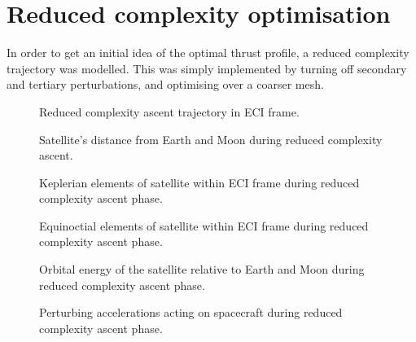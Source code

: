
\section{Reduced complexity optimisation}

In order to get an initial idea of the optimal thrust profile, a reduced complexity trajectory was modelled. This was simply implemented by turning off secondary and tertiary perturbations, and optimising over a coarser mesh. 


\begin{figure}
\centering
\def\svgwidth{\figurewidth}

\caption{Reduced complexity ascent trajectory in ECI frame.}
\label{fig:Ascent2-3D}
\end{figure}

\begin{figure}
\centering
\def\svgwidth{\figurewidth}

\caption{Satellite's distance from Earth and Moon during reduced complexity ascent.}
\label{fig:Ascent2-dist}
\end{figure}

\begin{figure}
\centering
\def\svgwidth{\figurewidth}

\caption{Keplerian elements of satellite within ECI frame during reduced complexity ascent phase.}
\label{fig:Ascent2-kep}
\end{figure}

\begin{figure}
\centering
\def\svgwidth{\figurewidth}

\caption{Equinoctial elements of satellite within ECI frame during reduced complexity ascent phase.}
\label{fig:Ascent2-mee}
\end{figure}

\begin{figure}
\centering
\def\svgwidth{\figurewidth}

\caption{Orbital energy of the satellite relative to Earth and Moon during reduced complexity ascent phase.}
\label{fig:Ascent2-orbeng}
\end{figure}

\begin{figure}
\centering
\def\svgwidth{\figurewidth}

\caption{Perturbing accelerations acting on spacecraft during reduced complexity ascent phase.}
\label{fig:Ascent2-pert}
\end{figure}


